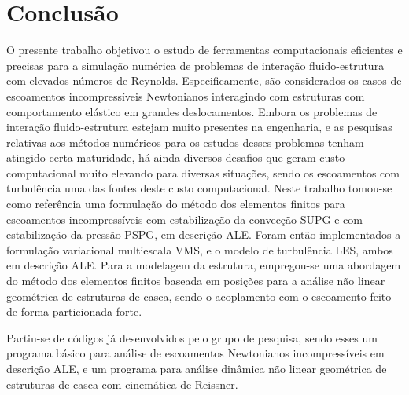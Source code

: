 \chapter{Conclusão} \label{Conclusao}

O presente trabalho objetivou o estudo de ferramentas computacionais eficientes e precisas para a simulação numérica de problemas de interação fluido-estrutura com elevados números de Reynolds. Especificamente, são considerados os casos de escoamentos incompressíveis Newtonianos interagindo com estruturas com comportamento elástico em grandes deslocamentos. Embora os problemas de interação fluido-estrutura estejam muito presentes na engenharia, e as pesquisas relativas aos métodos numéricos para os estudos desses problemas tenham atingido certa maturidade, há ainda diversos desafios que geram custo computacional muito elevando para diversas situações, sendo os escoamentos com turbulência uma das fontes deste custo computacional. Neste trabalho tomou-se como referência uma formulação do método dos elementos finitos para escoamentos incompressíveis com estabilização da convecção SUPG e com estabilização da pressão PSPG, em descrição ALE. Foram então implementados a formulação variacional multiescala VMS, e o modelo de turbulência LES, ambos em descrição ALE. Para a modelagem da estrutura, empregou-se uma abordagem do método dos elementos finitos baseada em posições para a análise não linear geométrica de estruturas de casca, sendo o acoplamento com o escoamento feito de forma particionada forte.

Partiu-se de códigos já desenvolvidos pelo grupo de pesquisa, sendo esses um programa básico para análise de escoamentos Newtonianos incompressíveis em descrição ALE, e um programa para análise dinâmica não linear geométrica de estruturas de casca com cinemática de Reissner.

